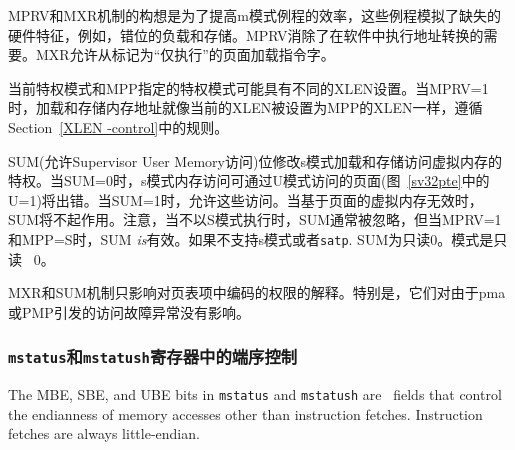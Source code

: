 \begin{commentary}
MPRV和MXR机制的构想是为了提高m模式例程的效率，这些例程模拟了缺失的硬件特征，例如，错位的负载和存储。MPRV消除了在软件中执行地址转换的需要。MXR允许从标记为“仅执行”的页面加载指令字。

当前特权模式和MPP指定的特权模式可能具有不同的XLEN设置。当MPRV=1时，加载和存储内存地址就像当前的XLEN被设置为MPP的XLEN一样，遵循Section~\ref{XLEN -control}中的规则。
\end{commentary}

\iffalse
The SUM (permit Supervisor User Memory access) bit modifies the privilege with
which S-mode loads and stores access virtual memory.
When SUM=0, S-mode memory accesses to pages that are accessible by U-mode (U=1
in Figure~\ref{sv32pte}) will fault.  When SUM=1, these accesses are
permitted.  SUM has no effect when page-based virtual memory is not in effect.
Note that, while SUM is ordinarily ignored when not executing in S-mode, it
{\em is} in effect when MPRV=1 and MPP=S.  SUM is read-only 0 if S-mode is
not supported or if {\tt satp}.MODE is read-only~0.

The MXR and SUM mechanisms only affect the interpretation of permissions
encoded in page-table entries.  In particular, they have no impact on whether
access-fault exceptions are raised due to PMAs or PMP.
\fi

SUM(允许Supervisor User Memory访问)位修改s模式加载和存储访问虚拟内存的特权。当SUM=0时，s模式内存访问可通过U模式访问的页面(图~\ref{sv32pte}中的U=1)将出错。当SUM=1时，允许这些访问。当基于页面的虚拟内存无效时，SUM将不起作用。注意，当不以S模式执行时，SUM通常被忽略，但当MPRV=1和MPP=S时，SUM {\em is}有效。如果不支持s模式或者{\tt satp}. SUM为只读0。模式是只读~ 0。

MXR和SUM机制只影响对页表项中编码的权限的解释。特别是，它们对由于pma或PMP引发的访问故障异常没有影响。

\subsubsection{{\tt mstatus}和{\tt mstatush}寄存器中的端序控制}

\iffalse
The MBE, SBE, and UBE bits in {\tt mstatus} and {\tt mstatush} are
\warl\ fields that control the endianness of memory accesses other than
instruction fetches.
Instruction fetches are always little-endian.


